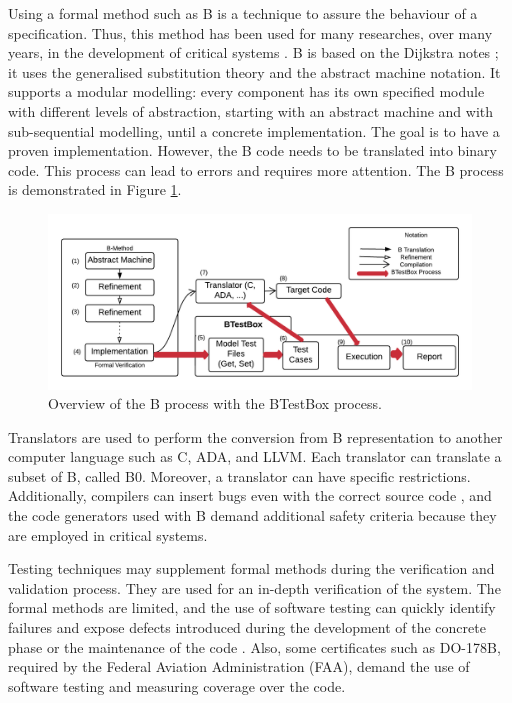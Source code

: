 \documentclass[runningheads]{llncs}
\begin{document}
Using a formal method such as B is a technique to assure the behaviour of a specification.
Thus, this method has been used for many researches, over many years, in the development of critical systems \cite{valerio_thesis:2016}. B is based on the Dijkstra notes \cite{dijkstra1976discipline}; it uses the generalised substitution theory \cite{hoare2002proof} and the abstract machine notation. It supports a modular modelling:  every component has its own specified module with different levels of abstraction, starting with an abstract machine and with sub-sequential modelling, until a concrete implementation. The goal is to have a proven implementation. However, the B code needs to be translated into binary code. This process can lead to errors and requires more attention. The B process is demonstrated in Figure \ref{fig:Bmethod}.

\begin{figure}[ht]
    \centering
    \includegraphics[width = \textwidth]{imagens/BMethodBTestBoxColor.png}
    \caption{Overview of the B process with the BTestBox process.}
    \label{fig:Bmethod}
\end{figure}

Translators are used to perform the conversion from B representation to another computer language such as C, ADA, and LLVM. Each translator can translate a subset of B, called B0. Moreover, a translator can have specific restrictions. %
Additionally, compilers can insert bugs even with the correct source code \cite{leroy2009formal}, and the code generators used with B demand additional safety criteria because they are employed in critical systems.

Testing techniques may supplement formal methods during the verification and validation process. They are used for an in-depth verification of the system. The formal methods are limited, and the use of software testing can quickly identify failures and expose defects introduced during the development of the concrete phase or the maintenance of the code \cite{ernesto_thesis:2016}. Also, some certificates such as DO-178B, required by the Federal Aviation Administration (FAA), demand the use of software testing and measuring coverage over the code.
\end{document}
